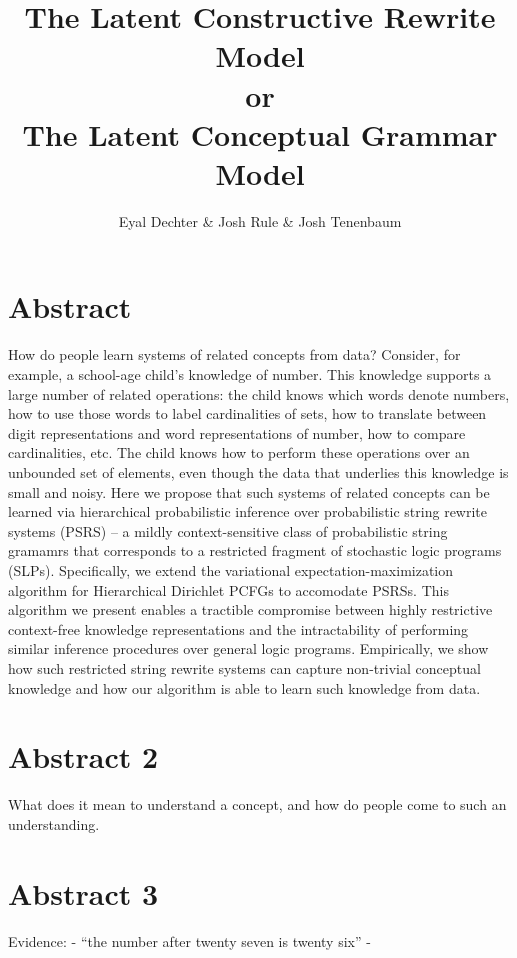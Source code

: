 \documentclass{article}
\title{The Latent Constructive Rewrite Model \\ or \\ The Latent Conceptual Grammar Model}
\author{Eyal Dechter \& Josh Rule \& Josh Tenenbaum}
\begin{document}
\maketitle

\section{Abstract}
How do people learn systems of related concepts from data? Consider,
for example, a school-age child's knowledge of number. This knowledge
supports a large number of related operations: the child knows which
words denote numbers, how to use those words to label cardinalities of
sets, how to translate between digit representations and word
representations of number, how to compare cardinalities, etc. The
child knows how to perform these operations over an unbounded set of
elements, even though the data that underlies this knowledge is small
and noisy. Here we propose that such systems of related concepts can
be learned via hierarchical probabilistic inference over probabilistic
string rewrite systems (PSRS) -- a mildly context-sensitive class of
probabilistic string gramamrs that corresponds to a restricted
fragment of stochastic logic programs (SLPs). Specifically, we extend
the variational expectation-maximization algorithm for Hierarchical
Dirichlet PCFGs to accomodate PSRSs. This algorithm we present enables
a tractible compromise between highly restrictive context-free
knowledge representations and the intractability of performing similar
inference procedures over general logic programs. Empirically, we show
how such restricted string rewrite systems can capture non-trivial
conceptual knowledge and how our algorithm is able to learn such
knowledge from data.

\section{Abstract 2}
What does it mean to understand a concept, and how do people come to
such an understanding.

\section{Abstract 3}
Evidence: 
  - ``the number after twenty seven is twenty six''
  - 
\end{document}
